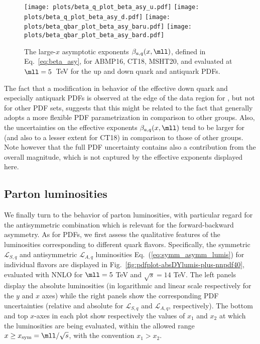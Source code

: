 \begin{figure}[!t]
 \centering
 \texttt{[image: plots/beta\_q\_plot\_beta\_asy\_u.pdf]}
 \texttt{[image: plots/beta\_q\_plot\_beta\_asy\_d.pdf]}
 \texttt{[image: plots/beta\_qbar\_plot\_beta\_asy\_baru.pdf]}
 \texttt{[image: plots/beta\_qbar\_plot\_beta\_asy\_bard.pdf]}
 \caption{\small The large-$x$ asymptotic exponents $\beta_{a,q}(x,\mll)$, defined
   in Eq.~\eqref{eq:beta_asy},
   for ABMP16, CT18, MSHT20, and  evaluated at $\mll=5$~TeV
   for the up and down quark and antiquark PDFs.}    
 \label{fig:asy_exponents}
\end{figure}

The fact that a modification in behavior of the effective down quark
and especially antiquark PDFs is observed at the edge of the data
region for , but not for other PDF sets, suggests that this
might be related to the fact that   generally adopts a more
flexible PDF parametrization in comparison to other groups.
%
Also, the  uncertainties on the effective exponents
$\beta_{a,q}(x,\mll)$ tend to be larger for  (and also to a
lesser extent for CT18) in comparison to those of other groups.
Note however that the full PDF uncertainty contains also a
contribution from the overall 
magnitude, which is not captured by the effective exponents displayed here.

\subsection{Parton luminosities}
\label{subsec:partoniclumis}

We finally turn to the behavior of parton luminosities, with
particular regard for the antisymmetric combination which is relevant
for the forward-backward asymmetry.
As for PDFs, we first assess the qualitative features of the
luminosities corresponding to different quark flavors.
Specifically, the symmetric $\mathcal{L}_{S,q}$ and antisymmetric
$\mathcal{L}_{A,q}$ luminosities
Eq.~(\ref{eq:symm_asymm_lumis})  for individual flavors are
displayed in Fig.~\ref{fig:pdfplot-absDYlumis-plus-nnpdf40},
evaluated with  NNLO for $\mll=5$ TeV and $\sqrt{s}=14$ TeV.
%
The left panels display the absolute luminosities (in logarithmic and
linear scale respectively
for the $y$ and $x$ axes)
while the right panels show the corresponding PDF uncertainties (relative and absolute for
$\mathcal{L}_{S,q}$ and $\mathcal{L}_{A,q}$, respectively).
%
The bottom  and top $x$-axes in each plot show respectively the values
of $x_1$ and $x_2$  at which the
luminosities are being evaluated, within the allowed range
$x \ge x_{\rm sym}=\mll/\sqrt{s}$, with the convention $x_1>x_2$.

